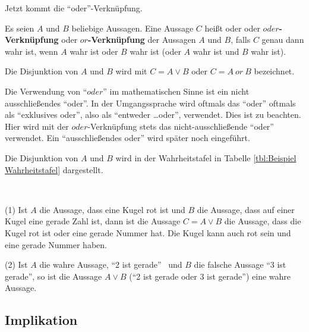 \begin{Unit} Jetzt kommt die 
\enquote{oder}-Verknüpfung.

\begin{Definition}
Es seien $A$ und $B$ beliebige Aussagen. Eine Aussage $C$ heißt
 oder  oder 
\textbf{$oder$-Verknüpfung} 
oder \textbf{$or$-Verknüpfung} der Aussagen $A$ und $B$, falls $C$ 
genau dann wahr ist, wenn $A$ wahr ist oder $B$ wahr ist (oder $A$ wahr ist 
und $B$ wahr ist). 
\end{Definition}

Die Disjunktion von $A$ und $B$ wird mit $C = A \lor  B$ oder $C = A\ or\ B$ 
bezeichnet.

Die Verwendung von \enquote{$oder$} im mathematischen Sinne ist ein nicht
ausschließendes \enquote{oder}. In der Umgangssprache wird oftmals das
\enquote{oder} oftmals als \enquote{exklusives oder}, also als 
\enquote{entweder \ldots oder}, verwendet. Dies ist zu beachten. Hier wird 
mit der $oder$-Verknüpfung stets das nicht-ausschließende \enquote{oder} 
verwendet. Ein \enquote{ausschließendes oder} wird später noch eingeführt.

Die Disjunktion von $A$ und $B$ wird in der Wahrheitstafel in Tabelle
\ref{tbl:Beispiel Wahrheitstafel} dargestellt.
\end{Unit}

\begin{Unit}[Beispiel] \ 

(1) Ist $A$ die Aussage, dass eine Kugel rot ist und $B$ die Aussage, dass 
auf einer Kugel eine gerade Zahl ist, dann ist die Aussage $C = A \lor B$ die
Aussage, dass die Kugel rot ist oder eine gerade Nummer hat. Die Kugel kann 
auch rot sein und eine gerade Nummer haben.

(2) Ist $A$ die wahre Aussage, \enquote{2 ist gerade} \ und $B$ die falsche 
Aussage \enquote{3 ist gerade}, so ist die Aussage $A \lor B$ (\enquote{2 ist 
gerade oder 3 ist gerade}) eine wahre Aussage.
\end{Unit}

\subsection*{Implikation}

